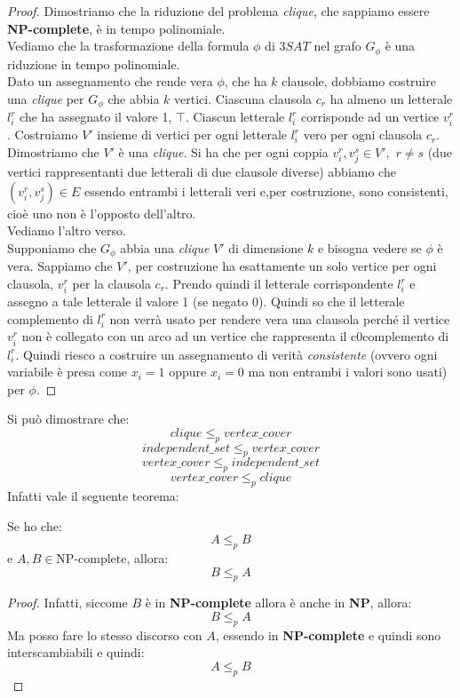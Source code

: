 \documentclass[a4paper,12pt, oneside]{book}
\begin{document}
\begin{proof}
  Dimostriamo che la riduzione del problema \textit{clique}, che sappiamo essere
  \textbf{NP-complete}, è in tempo polinomiale.\\ 
  Vediamo che la trasformazione della formula $\phi$ di $3SAT$ nel grafo
  $G_\phi$ è una riduzione in tempo polinomiale.\\
  Dato un assegnamento che rende vera $\phi$, che ha $k$ clausole, dobbiamo
  costruire una \textit{clique} per $G_\phi$ che abbia $k$ vertici. Ciascuna
  clausola $c_{r}$ ha almeno un letterale $l_{i}^r$ che ha assegnato il valore 1,
  $\top$. Ciascun letterale $l_{i}^r$ corrisponde ad un vertice
  $v_{i}^r$. Costruiamo $V'$ insieme di vertici per ogni letterale $l_i^r$ vero
  per ogni clausola $c_r$. Dimostriamo che $V'$ è una \textit{clique}. Si ha che
  per ogni coppia $v_i^r,v_j^s\in V',\,\,r\neq s$ (due vertici rappresentanti
  due letterali di due clausole diverse) abbiamo che $(v_i^r,v_j^s)\in
  E$ essendo entrambi i letterali veri e,per costruzione, sono consistenti, cioè
  uno non è l'opposto dell'altro.\\
  Vediamo l'altro verso.\\
  Supponiamo che $G_\phi$ abbia una \textit{clique} $V'$ di dimensione $k$ e
  bisogna vedere se $\phi$ è vera. Sappiamo che $V'$, per costruzione ha
  esattamente un solo vertice per ogni clausola, $v_i^r$ per la clausola
  $c_r$. Prendo quindi il letterale corrispondente $l_i^r$ e assegno a tale
  letterale il valore 1 (se negato 0). Quindi so che il letterale complemento di
  $l_i^r$ non verrà usato per rendere vera una clausola perché il vertice
  $v_i^r$ non è collegato con un arco ad un vertice che rappresenta il
  c0complemento di $l_i^r$. Quindi riesco a costruire un assegnamento di verità
  \textit{consistente} (ovvero ogni variabile è presa come $x_i=1$ oppure
  $x_i=0$ ma non entrambi i valori sono usati) per $\phi$.
\end{proof}
Si può dimostrare che:
\[clique\leq_p vertex\_cover\]
\[independent\_set\leq_p vertex\_cover\]
\[vertex\_cover\leq_p independent\_set\]
\[vertex\_cover\leq_p clique\]
Infatti vale il seguente teorema:
\begin{teorema}
  Se ho che:
  \[A\leq_p B\]
  e $A,B\in \mbox{NP-complete}$, allora:
  \[B\leq_p A\]
\end{teorema}
\begin{proof}
    Infatti, siccome $B$ è in \textbf{NP-complete} allora è anche in \textbf{NP},
  allora: 
  \[B\leq_p A\]
  Ma posso fare lo stesso discorso con $A$, essendo in \textbf{NP-complete} e
  quindi sono interscambiabili e quindi:
  \[A\leq_p B\]
\end{proof}
\end{document}

